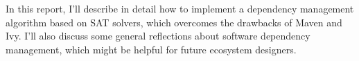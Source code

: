In this report, I'll describe in detail how to implement a dependency management algorithm based on SAT solvers, which overcomes the drawbacks of Maven and Ivy. I'll also discuss some general reflections about software dependency management, which might be helpful for future ecosystem designers.




